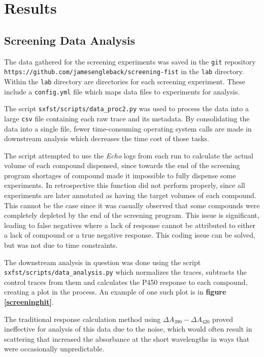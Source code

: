 \documentclass[16pt]{book}
\begin{document}
%


\section{Results}
\subsection{Screening Data Analysis}

The data gathered for the screening experiments was saved in the \texttt{git} repository  \texttt{https://github.com/jamesengleback/screening-fist} in the \texttt{lab} directory.
Within the \texttt{lab} directory are directories for each screening experiment.
These include a \texttt{config.yml} file which maps data files to experiments for analysis.
\par
The script \texttt{sxfst/scripts/data\_proc2.py} was used to process the data into a large \texttt{csv} file containing each raw trace and its metadata.
By consolidating the data into a single file, fewer time-consuming operating system calls are made in downstream analysis which decreases the time cost of those tasks.

The script attempted to use the \textit{Echo} logs from each run to calculate the actual volume of each compound dispensed, since towards the end of the screening program shortages of compound made it impossible to fully dispense some experiments.
In retrospective this function did not perform properly, since all experiments are later annotated as having the target volumes of each compound.
This cannot be the case since it was casually observed that some compounds were completely depleted by the end of the screening program.
This issue is significant, leading to false negatives where a lack of response cannot be attributed to either a lack of compound or a true negative response.
This coding issue can be solved, but was not due to time constraints.

The downstream analysis in question was done using the script \texttt{sxfst/scripts/data\_analysis.py} which normalizes the traces, subtracts the control traces from them and calculates the P450 response to each compound, creating a plot in the process.
An example of one such plot is in \textbf{figure \ref{screeninghit}}.

The traditional response calculation method using $\Delta A_{390} - \Delta A_{420}$ proved ineffective for analysis of this data due to the noise, which would often result in scattering that increased the absorbance at the short wavelengths in ways that were occasionally unpredictable.
\end{document}
